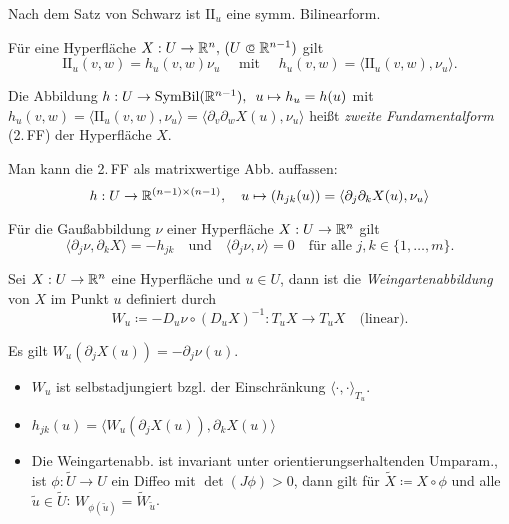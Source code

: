 \documentclass{cheat-sheet}
\DeclareMathOperator{\SymBil}{SymBil} %
\newcommand{\FFII}{\mathrm{I\!I}} %
\begin{document}
\begin{bem}
  Nach dem Satz von Schwarz ist $\FFII_u$ eine symm. Bilinearform.
\end{bem}

\begin{bem}
  Für eine Hyperfläche $X : U \to \R^n, \, (U \opn \R^{n-1})$ gilt
  \[ \FFII_u(v, w) = h_u(v, w) \nu_u \quad \text{ mit } \quad h_u(v, w) = \langle \FFII_u(v, w) , \nu_u \rangle. \]
\end{bem}

\begin{defn} Die Abbildung \enspace $h : U \to \SymBil(\R^{n-1}), \enspace u \mapsto h_u = h(u)$
  mit $h_u(v, w) = \langle \FFII_u(v, w), \nu_u \rangle = \langle \partial_v \partial_w X(u), \nu_u \rangle$ heißt \emph{zweite Fundamentalform} (2.\,FF) der Hyperfläche $X$.
\end{defn}

\begin{bem}
  Man kann die 2.\,FF als matrixwertige Abb. auffassen:
  \[ h : U \to \mathbb{R}^{(n-1) \times (n-1)}, \quad u \mapsto (h_{jk}(u)) = \langle \partial_j \partial_k X(u), \nu_u \rangle \]
\end{bem}

\begin{satz}
  Für die Gaußabbildung $\nu$ einer Hyperfläche $X : U \to \mathbb{R}^n$ gilt
  \[
    \langle \partial_j \nu , \partial_k X \rangle = - h_{jk}
    \quad \text{und} \quad
    \langle \partial_j \nu, \nu \rangle = 0
    \quad \text{für alle } j, k \in \{ 1, \ldots, m \}.
  \]
\end{satz}

\begin{defn}
  Sei $X : U \to \mathbb{R}^n$ eine Hyperfläche und $u \in U$, dann ist die
  \emph{Weingartenabbildung} von $X$ im Punkt $u$ definiert durch
  \[
    W_u \coloneqq - D_u \nu \circ (D_u X)^{-1} : T_u X \to T_u X
    \quad \text{(linear).}
  \]
\end{defn}

\begin{bem}
  Es gilt $W_u(\partial_j X(u)) = - \partial_j \nu(u)$.
\end{bem}

\begin{satz}
  \begin{itemize}
    \item $W_u$ ist selbstadjungiert bzgl. der Einschränkung $\langle \cdot , \cdot \rangle_{T_u}$.
    \item $h_{jk}(u) = \langle W_u(\partial_j X(u)), \partial_k X(u) \rangle$
    \item Die Weingartenabb. ist invariant unter orientierungserhaltenden Umparam., \dh{} ist $\phi : \tilde{U} \to U$ ein Diffeo mit $\det(J\phi) > 0$, dann gilt für $\tilde{X} \coloneqq X \circ \phi$ und alle $\tilde{u} \in \tilde{U}$: $W_{\phi(\tilde{u})} = \tilde{W}_{\tilde{u}}$.
  \end{itemize}
\end{satz}
\end{document}
